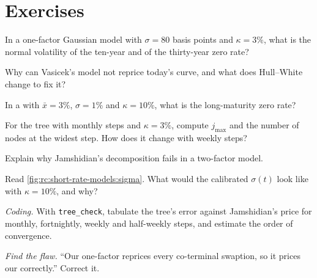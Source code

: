\section{Exercises}

\begin{exercise}[$\star$]\label{exo:rc:short-rate-models:1}
In a one-factor Gaussian model with $\sigma = 80$ basis points and $\kappa = 3\%$,
what is the normal volatility of the ten-year and of the thirty-year zero rate?
\end{exercise}

\begin{exercise}[$\star$]\label{exo:rc:short-rate-models:2}
Why can Vasicek's model not reprice today's curve, and what does Hull--White
change to fix it?
\end{exercise}

\begin{exercise}[$\star$]\label{exo:rc:short-rate-models:3}
In a  with $\bar x = 3\%$, $\sigma = 1\%$ and $\kappa = 10\%$, what is the
long-maturity zero rate?
\end{exercise}

\begin{exercise}[$\star\star$]\label{exo:rc:short-rate-models:4}
For the tree with monthly steps and $\kappa=3\%$, compute $j_{\max}$ and the number of
nodes at the widest step. How does it change with weekly steps?
\end{exercise}

\begin{exercise}[$\star\star$]\label{exo:rc:short-rate-models:5}
Explain why Jamshidian's decomposition fails in a two-factor model.
\end{exercise}

\begin{exercise}[$\star\star$]\label{exo:rc:short-rate-models:6}
Read \cref{fig:rc:short-rate-models:sigma}. What would the calibrated $\sigma(t)$ look
like with $\kappa=10\%$, and why?
\end{exercise}

\begin{exercise}[$\star\star\star$]\label{exo:rc:short-rate-models:7}
\emph{Coding.} With \texttt{tree\_check}, tabulate the tree's error against
Jamshidian's price for monthly, fortnightly, weekly and half-weekly steps, and
estimate the order of convergence.
\end{exercise}

\begin{exercise}[$\star\star\star$]\label{exo:rc:short-rate-models:8}
\emph{Find the flaw.} ``Our one-factor  reprices every co-terminal
swaption, so it prices our  correctly.'' Correct it.
\end{exercise}

